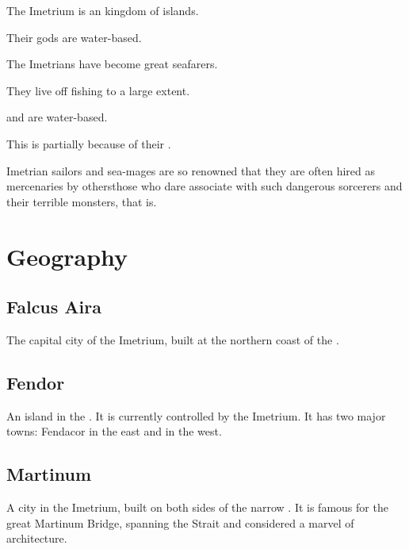 The Imetrium is an kingdom of islands. 

Their gods are water-based. 

The Imetrians have become great seafarers. 

They live off fishing to a large extent. 

 and  are water-based. 

This is partially because of their . 

Imetrian sailors and sea-mages are so renowned that they are often hired as mercenaries by others\dash{}those who dare associate with such dangerous sorcerers and their terrible monsters, that is.








\section{Geography}





\subsection{Falcus Aira}
The capital city of the Imetrium, built at the northern coast of the . 





\subsection{Fendor}
An island in the . 
It is currently controlled by the Imetrium. It has two major towns: Fendacor in the east and \Cicora{} in the west.





\subsection{Martinum}
A city in the Imetrium, built on both sides of the narrow . 
It is famous for the great Martinum Bridge, spanning the Strait and considered a marvel of architecture. 

